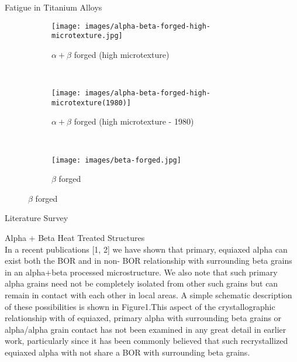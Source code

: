 \documentclass[10pt]{beamer}
\begin{document}
{%
\begin{frame}[fragile]{Fatigue in Titanium Alloys}

\begin{figure}[H]
    \centering
    \begin{subfigure}{0.30\textwidth}
        \texttt{[image: images/alpha-beta-forged-high-microtexture.jpg]}
        \caption{\tiny $\alpha+\beta$ forged (high microtexture)}
        \label{fig:Ti-6242 Surface}
    \end{subfigure}
    \\
    \begin{subfigure}{0.30\textwidth}
        \texttt{[image: images/alpha-beta-forged-high-microtexture(1980)]}
        \caption{\tiny  $\alpha+\beta$ forged (high microtexture - 1980)}
        \label{fig:Ti-6242 Surface}
    \end{subfigure}
    ~
    \begin{subfigure}{0.30\textwidth}
        \texttt{[image: images/beta-forged.jpg]}
        \caption{\tiny $\beta$ forged}
        \label{fig:Ti-6242 Surface}
    \end{subfigure}        
  
    
\end{figure}

\end{frame}
}

{%
\begin{frame}[fragile]{Literature Survey}

Alpha + Beta Heat Treated Structures \\
In a recent publications [1, 2] we have shown that primary, equiaxed alpha can exist both the BOR and in non- BOR relationship with surrounding beta grains in an alpha+beta processed microstructure. We also note that such primary alpha grains need not be completely isolated from other such grains but can remain in contact with each other in local areas. A simple schematic description of these possibilities is shown in Figure1.This aspect of the crystallographic relationship with of equiaxed, primary alpha with surrounding beta grains or alpha/alpha grain contact has not been examined in any great detail in earlier work, particularly since it has been commonly believed that such recrystallized equiaxed alpha with not share a BOR with surrounding beta grains.

\end{frame}
}
\end{document}

